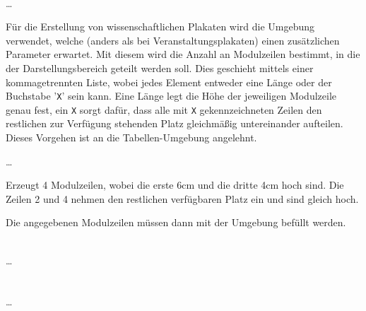 \begin{Declaration}
    \\
  \quad\dots\\
\end{Declaration}

Für die Erstellung von wissenschaftlichen Plakaten wird die Umgebung
 verwendet, welche
(anders als bei Veranstaltungsplakaten) einen
zusätzlichen Parameter  erwartet.
Mit diesem wird die Anzahl an Modulzeilen bestimmt, in die der Darstellungsbereich geteilt werden soll. Dies geschieht mittels einer kommagetrennten Liste,
wobei jedes Element entweder eine Länge oder der Buchstabe '\texttt{X}' sein kann.
Eine Länge legt die Höhe der jeweiligen Modulzeile genau fest,
ein \texttt{X} sorgt dafür, dass alle mit \texttt{X} gekennzeichneten
Zeilen den restlichen zur Verfügung stehenden Platz gleichmäßig untereinander
aufteilen.
Dieses Vorgehen ist an die Tabellen-Umgebung  angelehnt.

\begin{minipage}{0.6\textwidth}
\begin{Example}\par
  \noindent{}
    \par
  \quad\dots\\
  \bigskip\par
  \noindent Erzeugt 4 Modulzeilen, wobei die erste 6cm und die dritte 4cm hoch sind.
  Die Zeilen 2 und 4 nehmen den restlichen verfügbaren Platz ein
  und sind gleich hoch.
\end{Example}
\end{minipage}
\hfill
\begin{minipage}{0.3\textwidth}\centering
\end{minipage}

Die angegebenen Modulzeilen müssen dann mit der Umgebung 
befüllt werden.

\begin{Declaration}
    \\%
  \quad\dots\\
  \\
    \\%
  \quad\dots\\
\end{Declaration}

